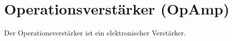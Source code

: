 \documentclass[fs, footer]{latex4ei}
\begin{document}
\begin{multicols*}{4}
{	
}

\section{Operationsverstärker (OpAmp)}
	Der Operationsverstärker ist ein elektronischer Verstärker.
	
\end{multicols*}
\end{document}
